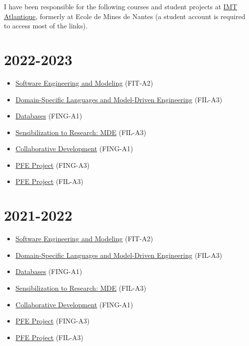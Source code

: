 I have been responsible for the following courses and student projects
at \href{https://www.imt-atlantique.fr/}{IMT Atlantique}, formerly at
Ecole de Mines de Nantes (a student account is required to access most
of the links).

\hypertarget{section}{%
\section{2022-2023}\label{section}}

\begin{itemize}
\tightlist
\item
  \href{https://moodle.imt-atlantique.fr/course/view.php?id=1481}{Software
  Engineering and Modeling} (FIT-A2)
\item
  \href{https://moodle.imt-atlantique.fr/course/view.php?id=1486}{Domain-Specific
  Languages and Model-Driven Engineering} (FIL-A3)
\item
  \href{https://formations.imt-atlantique.fr/bd_ihm}{Databases}
  (FING-A1)
\item
  \href{https://moodle.imt-atlantique.fr/course/view.php?id=299}{Sensibilization
  to Research: MDE} (FIL-A3)
\item
  \href{https://moodle.imt-atlantique.fr/course/view.php?id=16}{Collaborative
  Development} (FING-A1)
\item
  \href{https://moodle.imt-atlantique.fr/course/view.php?id=314}{PFE
  Project} (FING-A3)
\item
  \href{https://moodle.imt-atlantique.fr/course/view.php?id=314}{PFE
  Project} (FIL-A3)
\end{itemize}

\hypertarget{section-1}{%
\section{2021-2022}\label{section-1}}

\begin{itemize}
\tightlist
\item
  \href{https://moodle.imt-atlantique.fr/course/view.php?id=1481}{Software
  Engineering and Modeling} (FIT-A2)
\item
  \href{https://moodle.imt-atlantique.fr/course/view.php?id=1486}{Domain-Specific
  Languages and Model-Driven Engineering} (FIL-A3)
\item
  \href{https://formations.imt-atlantique.fr/bd_ihm}{Databases}
  (FING-A1)
\item
  \href{https://moodle.imt-atlantique.fr/course/view.php?id=299}{Sensibilization
  to Research: MDE} (FIL-A3)
\item
  \href{https://moodle.imt-atlantique.fr/course/view.php?id=16}{Collaborative
  Development} (FING-A1)
\item
  \href{https://moodle.imt-atlantique.fr/course/view.php?id=314}{PFE
  Project} (FING-A3)
\item
  \href{https://moodle.imt-atlantique.fr/course/view.php?id=314}{PFE
  Project} (FIL-A3)
\end{itemize}

